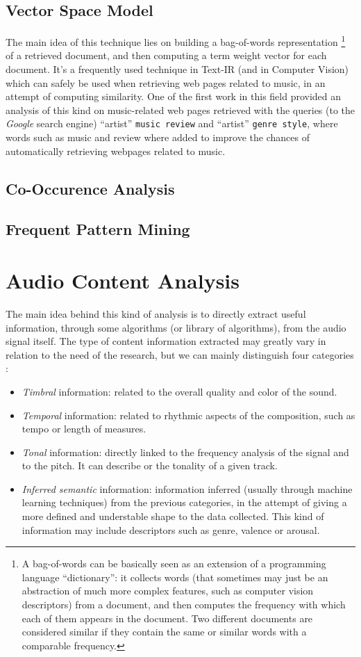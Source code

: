 \subsection{Vector Space Model} 
The main idea of this technique lies on building a bag-of-words representation \footnote{A bag-of-words can be basically seen as an extension of a programming language ``dictionary'': it collects words (that sometimes may just be an abstraction of much more complex features, such as computer vision descriptors) from a document, and then computes the frequency with which each of them appears in the document. Two different documents are considered similar if they contain the same or similar words with a comparable frequency.} of a retrieved document, and then computing a term weight vector for each document. It's a frequently used technique in Text-IR (and in Computer Vision) which can safely be used when retrieving web pages related to music, in an attempt of computing similarity. One of the first work in this field \cite{whitman02} provided an analysis of this kind on music-related web pages retrieved with the queries (to the \textit{Google} search engine) ``artist'' \texttt{music review} and ``artist'' \texttt{genre style}, where words such as music and review where added to improve the chances of automatically retrieving webpages related to music. 
\subsection{Co-Occurence Analysis}
\subsection{Frequent Pattern Mining}

\section{Audio Content Analysis}
The main idea behind this kind of analysis is to directly extract useful information, through some algorithms (or library of algorithms), from the audio signal itself. The type of content information extracted may greatly vary in relation to the need of the research, but we can mainly distinguish four categories \cite{bogdanov13}:
\begin{itemize}
\item \textit{Timbral} information: related to the overall quality and color of the sound.
\item \textit{Temporal} information: related to rhythmic aspects of the composition, such as tempo or length of measures.
\item \textit{Tonal} information: directly linked to the frequency analysis of the signal and to the pitch. It can describe  or the tonality of a given track.
\item \textit{Inferred semantic} information: information inferred (usually through machine learning techniques) from the previous categories, in the attempt of giving a more defined and understable shape to the data collected. This kind of information may include descriptors such as genre, valence or arousal.
\end{itemize}

